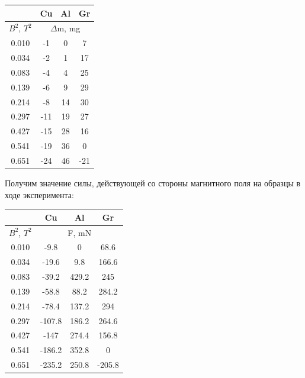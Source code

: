 \documentclass{article}
\begin{document}
    \begin{table}[H]
    \centering
    \begin{tabular}{|c|c|c|c|}
        \hline
        & Cu         & Al       & Gr                   \\\hline
    $B^2$, $T^2$& \multicolumn{3}{|c|}{$\Delta$m, mg}    \\\hline
        0.010   & -1         & 0        & 7       \\\hline
        0.034   & -2         & 1        & 17      \\\hline
        0.083   & -4         & 4        & 25      \\\hline
        0.139   & -6         & 9        & 29      \\\hline
        0.214   & -8         & 14       & 30      \\\hline
        0.297   & -11        & 19       & 27      \\\hline
        0.427   & -15        & 28       & 16      \\\hline
        0.541   & -19        & 36       & 0       \\\hline
        0.651   & -24        & 46       & -21     \\\hline
    \end{tabular} 
    \end{table}

    Получим значение силы, действующей со стороны магнитного поля на образцы в ходе эксперимента:

    \begin{table}[H]
        \centering
        \begin{tabular}{|c|c|c|c|}
            \hline
            & Cu         & Al       & Gr                       \\\hline
        $B^2$, $T^2$& \multicolumn{3}{|c|}{F, mN}              \\\hline
            0.010   & -9.8          & 0           & 68.6       \\\hline
            0.034   & -19.6         & 9.8         & 166.6      \\\hline
            0.083   & -39.2         & 429.2       & 245        \\\hline
            0.139   & -58.8         & 88.2        & 284.2      \\\hline
            0.214   & -78.4         & 137.2       & 294        \\\hline
            0.297   & -107.8        & 186.2       & 264.6      \\\hline
            0.427   & -147          & 274.4       & 156.8      \\\hline
            0.541   & -186.2        & 352.8       & 0          \\\hline
            0.651   & -235.2        & 250.8       & -205.8     \\\hline
        \end{tabular} 
        \end{table}
\end{document}
